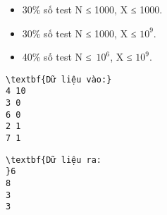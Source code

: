\begin{itemize}
	\item 30\% số test N ≤ 1000, X ≤ 1000.
	\item 30\% số test N ≤ 1000, X ≤ $10^{9}$.
	\item 40\% số test N ≤ $10^{6}$, X ≤ $10^{9}$.
\end{itemize}
\begin{verbatim}
\textbf{Dữ liệu vào:}
4 10
3 0
6 0
2 1
7 1\end{verbatim}
\begin{verbatim}
\textbf{Dữ liệu ra:
}6
8
3
3\end{verbatim}